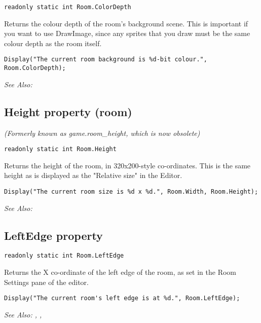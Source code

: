 \begin{verbatim}
readonly static int Room.ColorDepth
\end{verbatim}
Returns the colour depth of the room's background scene. This is important if
you want to use DrawImage, since any sprites that you draw must be the same
colour depth as the room itself.

\begin{verbatim}
Display("The current room background is %d-bit colour.", Room.ColorDepth);
\end{verbatim}

\it{See Also:} 


\subsection{Height property (room)}\label{Room.Height}%

\it{(Formerly known as game.room_height, which is now obsolete)}

\begin{verbatim}
readonly static int Room.Height
\end{verbatim}
Returns the height of the room, in 320x200-style co-ordinates. This is
the same height as is displayed as the "Relative size" in the Editor.

\begin{verbatim}
Display("The current room size is %d x %d.", Room.Width, Room.Height);
\end{verbatim}

\it{See Also:} 


\subsection{LeftEdge property}\label{Room.LeftEdge}%

\begin{verbatim}
readonly static int Room.LeftEdge
\end{verbatim}
Returns the X co-ordinate of the left edge of the room, as set in the Room Settings
pane of the editor.

\begin{verbatim}
Display("The current room's left edge is at %d.", Room.LeftEdge);
\end{verbatim}

\it{See Also:} , ,



